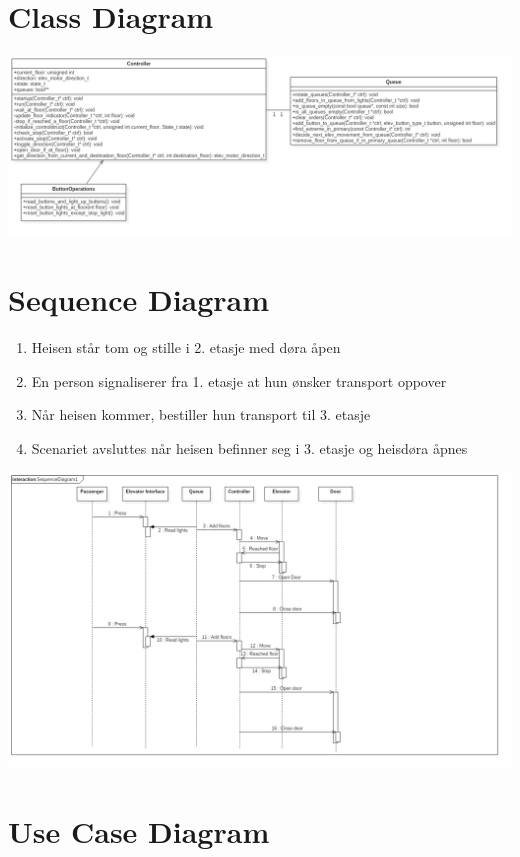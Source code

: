\documentclass[a4paper, norsk]{article}
\begin{document}


\section{Class Diagram}
\includegraphics[width=\textwidth]{./Class.png}


\section{Sequence Diagram}
\begin{enumerate}
\item Heisen står tom og stille i 2. etasje med døra åpen
\item En person signaliserer fra 1. etasje at hun ønsker transport oppover
\item Når heisen kommer, bestiller hun transport til 3. etasje
\item Scenariet avsluttes når heisen befinner seg i 3. etasje og heisdøra åpnes
\end{enumerate}
\includegraphics[width=\textwidth]{./Model__ButtonOperations__Interaction1__SequenceDiagram1_6.png}

\section{Use Case Diagram}
\end{document}
